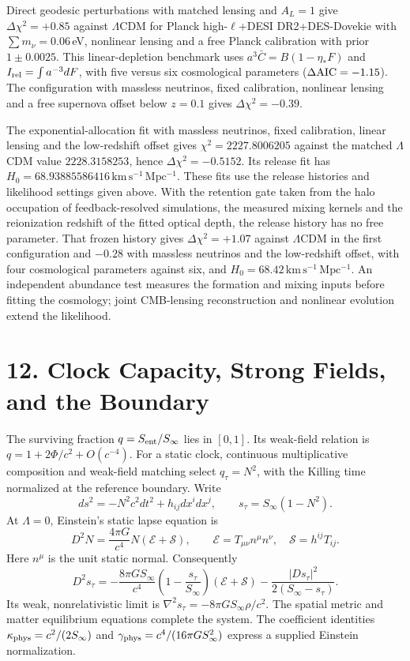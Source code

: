 \documentclass[11pt]{article}
\begin{document}
Direct geodesic perturbations with matched lensing and $A_L=1$ give $\Delta\chi^2=+0.85$ against $\Lambda$CDM for Planck high-$\ell$+DESI DR2+DES-Dovekie with $\sum m_\nu=0.06\,$eV, nonlinear lensing and a free Planck calibration with prior $1\pm0.0025$. This linear-depletion benchmark uses $a^3\bar C=B(1-\eta_*F)$ and $I_{\rm rel}=\int a^{-3}dF$, with five versus six cosmological parameters ($\Delta{\rm AIC}=-1.15$). The configuration with massless neutrinos, fixed calibration, nonlinear lensing and a free supernova offset below $z=0.1$ gives $\Delta\chi^2=-0.39$.

The exponential-allocation fit with massless neutrinos, fixed calibration, linear lensing and the low-redshift offset gives $\chi^2=2227.8006205$ against the matched $\Lambda$CDM value $2228.3158253$, hence $\Delta\chi^2=-0.5152$. Its release fit has $H_0=68.93885586416\,\mathrm{km\,s^{-1}\,Mpc^{-1}}$. These fits use the release histories and likelihood settings given above. With the retention gate taken from the halo occupation of feedback-resolved simulations, the measured mixing kernels and the reionization redshift of the fitted optical depth, the release history has no free parameter. That frozen history gives $\Delta\chi^2=+1.07$ against $\Lambda$CDM in the first configuration and $-0.28$ with massless neutrinos and the low-redshift offset, with four cosmological parameters against six, and $H_0=68.42\,\mathrm{km\,s^{-1}\,Mpc^{-1}}$. An independent abundance test measures the formation and mixing inputs before fitting the cosmology; joint CMB-lensing reconstruction and nonlinear evolution extend the likelihood.

\section{12. Clock Capacity, Strong Fields, and the Boundary}

The surviving fraction \(q=S_{\rm ent}/S_\infty\) lies in
\([0,1]\). Its weak-field relation is
\(q=1+2\Phi/c^2+O(c^{-4})\).
For a static clock, continuous multiplicative composition and
weak-field matching select \(q_\tau=N^2\), with the Killing
time normalized at the reference boundary.
Write
\[
ds^2=-N^2c^2dt^2+h_{ij}dx^idx^j,\qquad
s_\tau=S_\infty(1-N^2).
\]
At \(\Lambda=0\), Einstein's static lapse equation is
\[
D^2N=\frac{4\pi G}{c^4}N(\mathcal E+\mathcal S),
\qquad
\mathcal E=T_{\mu\nu}n^\mu n^\nu,\quad
\mathcal S=h^{ij}T_{ij}.
\]
Here \(n^\mu\) is the unit static normal. Consequently
\[
\boxed{D^2s_\tau=
-\frac{8\pi GS_\infty}{c^4}
\left(1-\frac{s_\tau}{S_\infty}\right)(\mathcal E+\mathcal S)
-\frac{|Ds_\tau|^2}{2(S_\infty-s_\tau)}.}
\]
Its weak, nonrelativistic limit is
\(\nabla^2s_\tau=-8\pi GS_\infty\rho/c^2\).
The spatial metric and matter equilibrium equations complete
the system. The coefficient identities
\(\kappa_{\rm phys}=c^2/(2S_\infty)\) and
\(\gamma_{\rm phys}=c^4/(16\pi GS_\infty^2)\)
express a supplied Einstein normalization.
\end{document}
